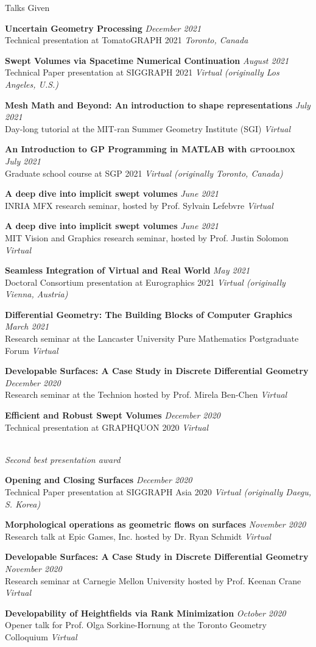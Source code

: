 \documentclass{resume}
\newcommand{\talk}[4]{
    {\bf #1} \hfill {\em \small #2} \\ %
    {\small #3} \hfill {\em \small #4}
}
\begin{document}
\begin{rSection}{Talks Given}
\talk{Uncertain Geometry Processing}{December 2021}
{Technical presentation at TomatoGRAPH 2021}{Toronto, Canada}

\talk{Swept Volumes via Spacetime Numerical Continuation}{August 2021}
{Technical Paper presentation at SIGGRAPH 2021}{Virtual (originally Los Angeles, U.S.)}

\talk{Mesh Math and Beyond: An introduction to shape representations}{July 2021}
{Day-long tutorial at the MIT-ran Summer Geometry Institute (SGI)}{Virtual}

\talk{An Introduction to GP Programming in MATLAB with \textsc{gptoolbox}}{July 2021}
{Graduate school course at SGP 2021}{Virtual (originally Toronto, Canada)}

\talk{A deep dive into implicit swept volumes}{June 2021}
{INRIA MFX research seminar, hosted by Prof. Sylvain Lefebvre}{Virtual}

\talk{A deep dive into implicit swept volumes}{June 2021}
{MIT Vision and Graphics research seminar, hosted by Prof. Justin Solomon}{Virtual}

\talk{Seamless Integration of Virtual and Real World}{May 2021}
{Doctoral Consortium presentation at Eurographics 2021}{Virtual (originally Vienna, Austria)}

\talk{Differential Geometry: The Building Blocks of Computer Graphics}{March 2021}
{Research seminar at the Lancaster University Pure Mathematics Postgraduate Forum}{Virtual}

\talk{Developable Surfaces: A Case Study in Discrete Differential Geometry}{December 2020}
{Research seminar at the Technion hosted by Prof. Mirela Ben-Chen}{Virtual}

\talk{Efficient and Robust Swept Volumes}{December 2020}
{Technical presentation at GRAPHQUON 2020}{Virtual}
\\{\it Second best presentation award}

\talk{Opening and Closing Surfaces}{December 2020}
{Technical Paper presentation at SIGGRAPH Asia 2020}{Virtual (originally Daegu, S. Korea)}

\talk{Morphological operations as geometric flows on surfaces}{November 2020}
{Research talk at Epic Games, Inc. hosted by Dr. Ryan Schmidt}{Virtual}

\talk{Developable Surfaces: A Case Study in Discrete Differential Geometry}{November 2020}
{Research seminar at Carnegie Mellon University hosted by Prof. Keenan Crane}{Virtual}

\talk{Developability of Heightfields via Rank Minimization}{October 2020}
{Opener talk for Prof. Olga Sorkine-Hornung at the Toronto Geometry Colloquium}{Virtual}


\end{rSection}
\end{document}
